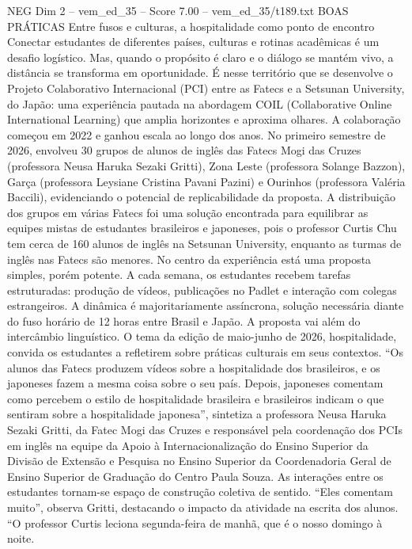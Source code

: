 \begin{textsample}{NEG Dim 2 – vem\_ed\_35 – Score 7.00 – vem\_ed\_35/t189.txt}  \label{ex:f2_neg_069}
BOAS PRÁTICAS Entre fusos e culturas, a hospitalidade como ponto de encontro Conectar estudantes de diferentes países, culturas e rotinas acadêmicas é um desafio logístico.
Mas, quando o propósito é claro e o diálogo se mantém vivo, a distância se transforma em oportunidade.
É nesse território que se desenvolve o Projeto Colaborativo Internacional (PCI) entre as Fatecs e a Setsunan University, do Japão: uma experiência pautada na abordagem COIL (Collaborative Online International Learning) que amplia horizontes e aproxima olhares.
A colaboração começou em 2022 e ganhou escala ao longo dos anos.
No primeiro semestre de 2026, envolveu 30 grupos de alunos de inglês das Fatecs Mogi das Cruzes (professora Neusa Haruka Sezaki Gritti), Zona Leste (professora Solange Bazzon), Garça (professora Leysiane Cristina Pavani Pazini) e Ourinhos (professora Valéria Baccili), evidenciando o potencial de replicabilidade da proposta.
A distribuição dos grupos em várias Fatecs foi uma solução encontrada para equilibrar as equipes mistas de estudantes brasileiros e japoneses, pois o professor Curtis Chu tem cerca de 160 alunos de inglês na Setsunan University, enquanto as turmas de inglês nas Fatecs são menores.
No centro da experiência está uma proposta simples, porém potente.
A cada semana, os estudantes recebem tarefas estruturadas: produção de vídeos, publicações no Padlet e interação com colegas estrangeiros.
A dinâmica é majoritariamente assíncrona, solução necessária diante do fuso horário de 12 horas entre Brasil e Japão.
A proposta vai além do intercâmbio linguístico.
O tema da edição de maio-junho de 2026, hospitalidade, convida os estudantes a refletirem sobre práticas culturais em seus contextos. “Os alunos das Fatecs produzem vídeos sobre a hospitalidade dos brasileiros, e os japoneses fazem a mesma coisa sobre o seu país.
Depois, japoneses comentam como percebem o estilo de hospitalidade brasileira e brasileiros indicam o que sentiram sobre a hospitalidade japonesa”, sintetiza a professora Neusa Haruka Sezaki Gritti, da Fatec Mogi das Cruzes e responsável pela coordenação dos PCIs em inglês na equipe da Apoio à Internacionalização do Ensino Superior da Divisão de Extensão e Pesquisa no Ensino Superior da Coordenadoria Geral de Ensino Superior de Graduação do Centro Paula Souza.
As interações entre os estudantes tornam-se espaço de construção coletiva de sentido. “Eles comentam muito”, observa Gritti, destacando o impacto da atividade na escrita dos alunos. “O professor Curtis leciona segunda-feira de manhã, que é o nosso domingo à noite.

\end{textsample}
